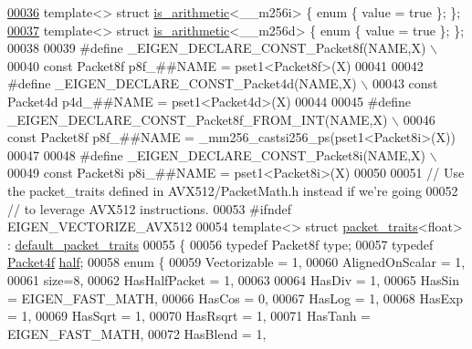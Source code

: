 \begin{DoxyCode}
\hyperlink{struct_eigen_1_1internal_1_1is__arithmetic_3_01____m256i_01_4}{00036} \textcolor{keyword}{template}<> \textcolor{keyword}{struct }\hyperlink{struct_eigen_1_1internal_1_1is__arithmetic}{is\_arithmetic}<\_\_m256i> \{ \textcolor{keyword}{enum} \{ value = \textcolor{keyword}{true} \}; \};
\hyperlink{struct_eigen_1_1internal_1_1is__arithmetic_3_01____m256d_01_4}{00037} \textcolor{keyword}{template}<> \textcolor{keyword}{struct }\hyperlink{struct_eigen_1_1internal_1_1is__arithmetic}{is\_arithmetic}<\_\_m256d> \{ \textcolor{keyword}{enum} \{ value = \textcolor{keyword}{true} \}; \};
00038 
00039 \textcolor{preprocessor}{#define \_EIGEN\_DECLARE\_CONST\_Packet8f(NAME,X) \(\backslash\)}
00040 \textcolor{preprocessor}{  const Packet8f p8f\_##NAME = pset1<Packet8f>(X)}
00041 
00042 \textcolor{preprocessor}{#define \_EIGEN\_DECLARE\_CONST\_Packet4d(NAME,X) \(\backslash\)}
00043 \textcolor{preprocessor}{  const Packet4d p4d\_##NAME = pset1<Packet4d>(X)}
00044 
00045 \textcolor{preprocessor}{#define \_EIGEN\_DECLARE\_CONST\_Packet8f\_FROM\_INT(NAME,X) \(\backslash\)}
00046 \textcolor{preprocessor}{  const Packet8f p8f\_##NAME = \_mm256\_castsi256\_ps(pset1<Packet8i>(X))}
00047 
00048 \textcolor{preprocessor}{#define \_EIGEN\_DECLARE\_CONST\_Packet8i(NAME,X) \(\backslash\)}
00049 \textcolor{preprocessor}{  const Packet8i p8i\_##NAME = pset1<Packet8i>(X)}
00050 
00051 \textcolor{comment}{// Use the packet\_traits defined in AVX512/PacketMath.h instead if we're going}
00052 \textcolor{comment}{// to leverage AVX512 instructions.}
00053 \textcolor{preprocessor}{#ifndef EIGEN\_VECTORIZE\_AVX512}
00054 \textcolor{keyword}{template}<> \textcolor{keyword}{struct }\hyperlink{struct_eigen_1_1internal_1_1packet__traits}{packet\_traits}<float>  : \hyperlink{struct_eigen_1_1internal_1_1default__packet__traits}{default\_packet\_traits}
00055 \{
00056   \textcolor{keyword}{typedef} Packet8f type;
00057   \textcolor{keyword}{typedef} \hyperlink{struct_eigen_1_1internal_1_1_packet4f}{Packet4f} \hyperlink{struct_eigen_1_1half}{half};
00058   \textcolor{keyword}{enum} \{
00059     Vectorizable = 1,
00060     AlignedOnScalar = 1,
00061     size=8,
00062     HasHalfPacket = 1,
00063 
00064     HasDiv  = 1,
00065     HasSin  = EIGEN\_FAST\_MATH,
00066     HasCos  = 0,
00067     HasLog  = 1,
00068     HasExp  = 1,
00069     HasSqrt = 1,
00070     HasRsqrt = 1,
00071     HasTanh  = EIGEN\_FAST\_MATH,
00072     HasBlend = 1,

\end{DoxyCode}
